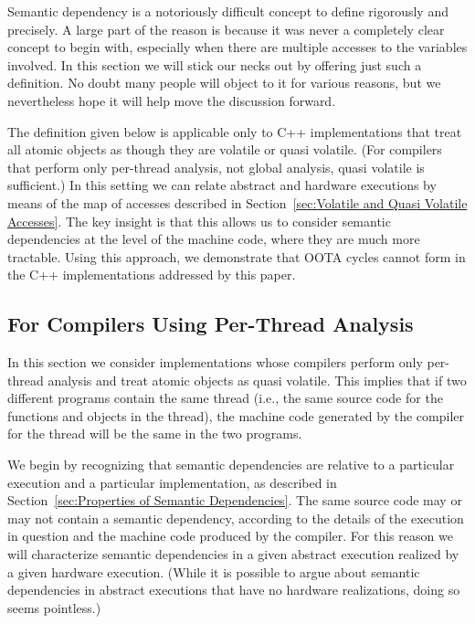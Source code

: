 Semantic dependency is a notoriously difficult concept to define
rigorously and precisely.
A large part of the reason is because it was never a completely clear
concept to begin with, especially when there are multiple accesses to
the variables involved.
In this section we will stick our necks out by offering just such a
definition.
No doubt many people will object to it for various reasons, but we
nevertheless hope it will help move the discussion forward.

The definition given below is applicable only to C++ implementations
that treat all atomic objects as though they are volatile or
quasi volatile.
(For compilers that perform only per-thread analysis, not global
analysis, quasi volatile is sufficient.)
In this setting we can relate abstract and hardware executions by
means of the map of accesses described in
Section~\ref{sec:Volatile and Quasi Volatile Accesses}.
The key insight is that this allows us to consider semantic
dependencies at the level of the machine code, where they are much
more tractable.
Using this approach, we demonstrate that OOTA cycles cannot form in the
C++ implementations addressed by this paper.

\subsection{For Compilers Using Per-Thread Analysis}
\label{sec:For Compilers Using Per-Thread Analysis}

In this section we consider implementations whose compilers perform
only per-thread analysis and treat atomic objects as
quasi volatile.
This implies that if two different programs contain the same thread
(i.e., the same source code for the functions and objects in the thread), the
machine code generated by the compiler for the thread will be the
same in the two programs.

We begin by recognizing that semantic dependencies are relative to a
particular execution and a particular implementation,
as described in Section~\ref{sec:Properties of Semantic Dependencies}.
The same source code may or may not contain a semantic dependency,
according to the details of the execution in question and the
machine code produced by the compiler.
For this reason we will characterize semantic dependencies in a given
abstract execution realized by a given hardware execution.
(While it is possible to argue about semantic dependencies in abstract
executions that have no hardware realizations, doing so seems pointless.)

